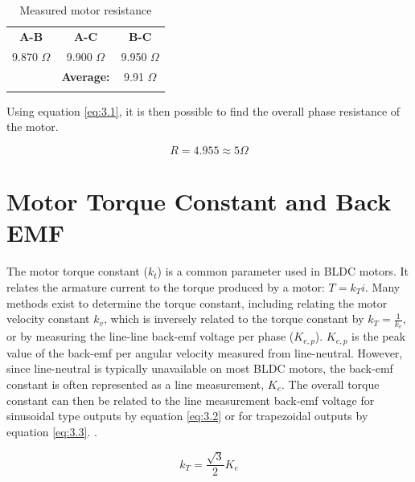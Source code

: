 \begin{table}[H]
	\begin{center}
		\caption{Measured motor resistance}
		\begin{tabular}[c]{ c c c }
			
			\textbf{A-B} & \textbf{A-C} & \textbf{B-C}\\
			
			\Xhline{2\arrayrulewidth}

			9.870 \(\Omega\)  & 9.900  \(\Omega\) & 9.950 \(\Omega\) \\
			
			\hline
			& \textbf{Average:} & 9.91 \(\Omega\) \\
			
			\Xhline{2\arrayrulewidth}
			\end{tabular}
			
			\label{measured_motor_resistance}
	\end{center}
\end{table}

Using equation \ref{eq:3.1}, it is then possible to find the overall phase resistance of the motor.

\begin{tcolorbox}[standard jigsaw,
	opacityback=0]
	\[R = 4.955 \approx 5 \Omega \]
	
\end{tcolorbox}

\section{Motor Torque Constant and Back EMF}
The motor torque constant (\(k_t\)) is a common parameter used in BLDC motors. It relates the armature current to the torque produced by a motor: \(T = k_T i \). Many methods exist to determine the torque constant, including relating the motor velocity constant \(k_v\), which is inversely related to the torque constant by \(k_T = \frac{1}{k_v} \), or by measuring the line-line back-emf voltage per phase (\(K_{e,p}\)). \(K_{e,p}\) is the peak value of the back-emf per angular velocity measured from line-neutral. However, since line-neutral is typically unavailable on most BLDC motors, the back-emf constant is often represented as a line measurement, \(K_{e}\). The overall torque constant can then be related to the line measurement back-emf voltage for sinusoidal type outputs by equation \ref{eq:3.2} or for trapezoidal outputs by equation \ref{eq:3.3}. \citep{5}. 

\begin{equation} \label{eq:3.2}
k_T = \frac{\sqrt{3}}{2} K_{e}
\end{equation}

